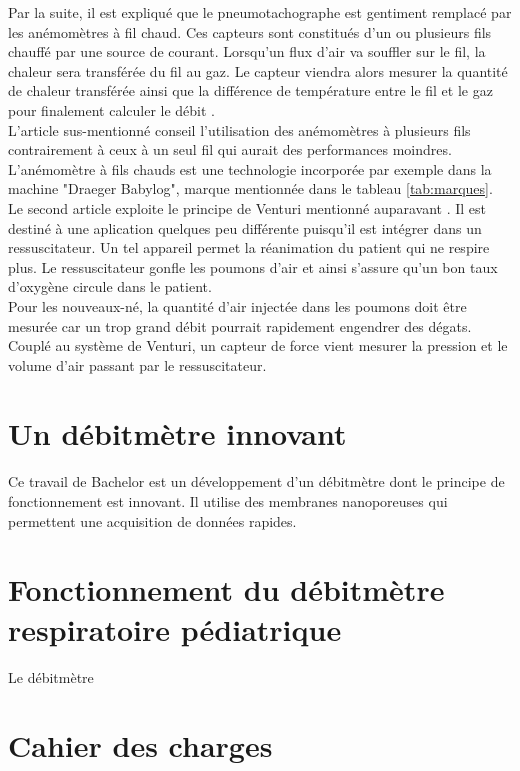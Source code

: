 Par la suite, il est expliqué que le pneumotachographe est gentiment remplacé par les anémomètres à fil chaud. Ces capteurs sont 
constitués d'un ou plusieurs fils chauffé par une source de courant. Lorsqu'un flux d'air va souffler sur le fil, la chaleur sera 
transférée du fil au gaz. Le capteur viendra alors mesurer la quantité de chaleur transférée ainsi que la différence de température entre 
le fil et le gaz pour finalement calculer le débit \cite{oberg_biomedical_2011}. \\
L'article sus-mentionné conseil l'utilisation des anémomètres à plusieurs fils contrairement à ceux à un seul fil qui aurait des performances 
moindres. 
L'anémomètre à fils chauds est une technologie incorporée par exemple dans la machine "Draeger Babylog", marque mentionnée dans le tableau \ref{tab:marques}. \\

Le second article exploite le principe de Venturi mentionné auparavant \cite{jacq_ultra-low_2011}. Il est destiné à une aplication 
quelques peu différente puisqu'il est  intégrer dans un ressuscitateur. Un tel appareil permet la réanimation du patient qui ne respire 
plus. Le ressuscitateur gonfle les poumons d'air et ainsi s'assure qu'un bon taux d'oxygène circule dans le patient. \\
Pour les nouveaux-né, la quantité d'air injectée dans les poumons doit être mesurée car un trop grand débit pourrait rapidement engendrer 
des dégats. \\
Couplé au système de Venturi, un capteur de force vient mesurer la pression et le volume d'air passant par le ressuscitateur. \\

\section{Un débitmètre innovant}
Ce travail de Bachelor est un développement d'un débitmètre dont le principe de fonctionnement est innovant. Il utilise des membranes 
nanoporeuses qui permettent une acquisition de données rapides. 

\section{Fonctionnement du débitmètre respiratoire pédiatrique}
Le débitmètre

\section{Cahier des charges}

